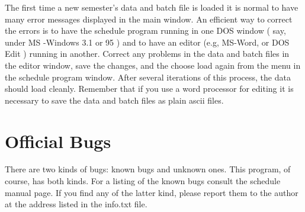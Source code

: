 The first time a new semester's data and batch file is loaded it is normal
to have many error messages displayed in the main window. An efficient way
to correct the errors is to have the schedule program running in one DOS 
window ( say, under MS -Windows 3.1 or 95 ) and to have an editor (e.g,
MS-Word, or DOS Edit ) running in another. Correct any problems in the
data and batch files in the editor window, save the changes, and the choose
load again from the menu in the schedule program window. After several
iterations of this process, the data should load cleanly. Remember that if
you use a word processor for editing it is necessary to save the data
and batch files as plain ascii files. 
 
\section{Official Bugs}
There are two kinds of bugs: known bugs and unknown ones. This program, of
course, has both kinds. For a listing of the known bugs consult the
schedule manual page. If you find any of the latter kind, please report
them to the author at the address listed in the info.txt file.


